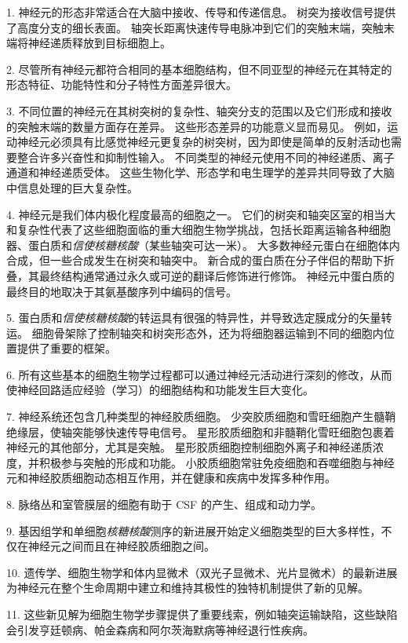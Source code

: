 1. 神经元的形态非常适合在大脑中接收、传导和传递信息。
树突为接收信号提供了高度分支的细长表面。
轴突长距离快速传导电脉冲到它们的突触末端，突触末端将神经递质释放到目标细胞上。


2. 尽管所有神经元都符合相同的基本细胞结构，但不同亚型的神经元在其特定的形态特征、功能特性和分子特性方面差异很大。


3. 不同位置的神经元在其树突树的复杂性、轴突分支的范围以及它们形成和接收的突触末端的数量方面存在差异。
这些形态差异的功能意义显而易见。
例如，运动神经元必须具有比感觉神经元更复杂的树突树，因为即使是简单的反射活动也需要整合许多兴奋性和抑制性输入。
不同类型的神经元使用不同的神经递质、离子通道和神经递质受体。
这些生物化学、形态学和电生理学的差异共同导致了大脑中信息处理的巨大复杂性。


4. 神经元是我们体内极化程度最高的细胞之一。
它们的树突和轴突区室的相当大和复杂性代表了这些细胞面临的重大细胞生物学挑战，包括长距离运输各种细胞器、蛋白质和\textit{信使核糖核酸}（某些轴突可达一米）。
大多数神经元蛋白在细胞体内合成，但一些合成发生在树突和轴突中。
新合成的蛋白质在分子伴侣的帮助下折叠，其最终结构通常通过永久或可逆的翻译后修饰进行修饰。
神经元中蛋白质的最终目的地取决于其氨基酸序列中编码的信号。


5. 蛋白质和\textit{信使核糖核酸}的转运具有很强的特异性，并导致选定膜成分的矢量转运。
细胞骨架除了控制轴突和树突形态外，还为将细胞器运输到不同的细胞内位置提供了重要的框架。


6. 所有这些基本的细胞生物学过程都可以通过神经元活动进行深刻的修改，从而使神经回路适应经验（学习）的细胞结构和功能发生巨大变化。


7. 神经系统还包含几种类型的神经胶质细胞。
少突胶质细胞和雪旺细胞产生髓鞘绝缘层，使轴突能够快速传导电信号。
星形胶质细胞和非髓鞘化雪旺细胞包裹着神经元的其他部分，尤其是突触。 
星形胶质细胞控制细胞外离子和神经递质浓度，并积极参与突触的形成和功能。
小胶质细胞常驻免疫细胞和吞噬细胞与神经元和神经胶质细胞动态相互作用，并在健康和疾病中发挥多种作用。


8. 脉络丛和室管膜层的细胞有助于 CSF 的产生、组成和动力学。


9. 基因组学和单细胞\textit{核糖核酸}测序的新进展开始定义细胞类型的巨大多样性，不仅在神经元之间而且在神经胶质细胞之间。


10. 遗传学、细胞生物学和体内显微术（双光子显微术、光片显微术）的最新进展为神经元在整个生命周期中建立和维持其极性的独特机制提供了新的见解。


11. 这些新见解为细胞生物学步骤提供了重要线索，例如轴突运输缺陷，这些缺陷会引发亨廷顿病、帕金森病和阿尔茨海默病等神经退行性疾病。



